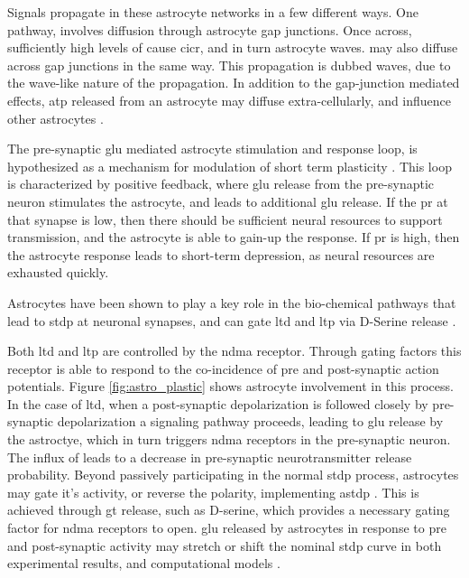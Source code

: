     Signals propagate in these astrocyte networks in a few different
    ways. One pathway, involves \ipt diffusion through astrocyte gap
    junctions. Once across, sufficiently high levels of \ipt cause
    \gls{cicr}, and in turn astrocyte waves. \ca may also diffuse across gap
    junctions in the same way. This propagation is dubbed \ca waves, due to
    the wave-like nature of the propagation. In addition to the gap-junction
    mediated effects, \gls{atp} released from an astrocyte may diffuse
    extra-cellularly, and influence other astrocytes \parencite{amiri_2013}.
    
    The pre-synaptic \gls{glu} mediated astrocyte stimulation and response loop,
    is hypothesized as a mechanism for modulation of short term plasticity
    \parencite{pitta_2012}. This loop is characterized by positive feedback,
    where \gls{glu} release from the pre-synaptic neuron stimulates the
    astrocyte, and leads to additional \gls{glu} release. If the \acrshort{pr}
    at that synapse is low, then there should be sufficient neural resources to
    support transmission, and the astrocyte is able to gain-up the response. If
    \acrshort{pr} is high, then the astrocyte response leads to short-term
    depression, as neural resources are exhausted quickly.

    Astrocytes have been shown to play a key role in the bio-chemical pathways
    that lead to \gls{stdp} at neuronal synapses, and can gate \gls{ltd} and
    \gls{ltp} via D-Serine release \parencite{manninen_2019}.

    Both \gls{ltd} and \gls{ltp} are controlled by the \gls{ndma}
    receptor. Through gating factors this receptor is able to respond to the
    co-incidence of pre and post-synaptic action potentials. Figure
    \ref{fig:astro_plastic} shows astrocyte involvement in this process. In the
    case of \gls{ltd}, when a post-synaptic depolarization is followed closely
    by pre-synaptic depolarization a signaling pathway proceeds, leading to
    \gls{glu} release by the astroctye, which in turn triggers \gls{ndma}
    receptors in the pre-synaptic neuron. The influx of \ca leads to a decrease
    in pre-synaptic neurotransmitter release probability. Beyond passively
    participating in the normal \gls{stdp} process, astrocytes may gate it's
    activity, or reverse the polarity, implementing \gls{astdp}
    \parencite{min_2012}. This is achieved through \gls{gt} release, such as
    D-serine, which provides a necessary gating factor for \gls{ndma} receptors
    to open. \Gls{glu} released by astrocytes in response to pre and
    post-synaptic activity may stretch or shift the nominal \gls{stdp} curve
    in both experimental results, and computational models \parencite{pitta_2016}.

